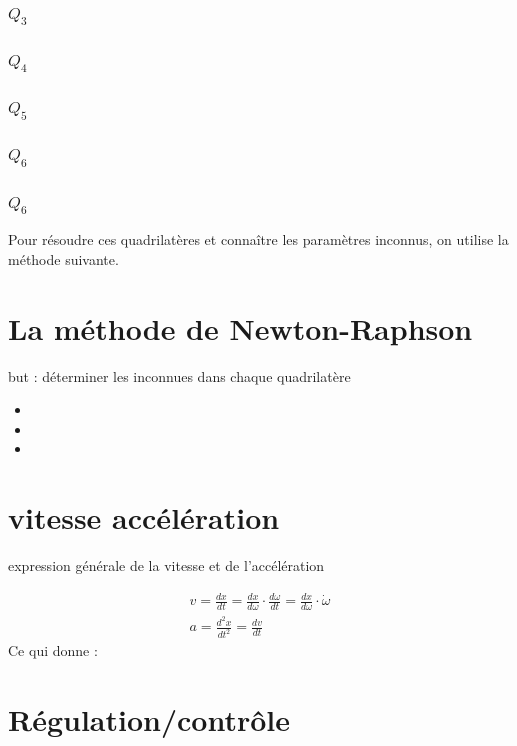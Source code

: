 \documentclass[12pt,a4paper]{article}
\begin{document}
\subsubsection{$Q_3$}

\subsubsection{$Q_4$}

\subsubsection{$Q_5$}

\subsubsection{$Q_6$}

\subsubsection{$Q_6$}

Pour résoudre ces quadrilatères et connaître les paramètres inconnus, on utilise la méthode suivante. 
\newpage
\section{La méthode de Newton-Raphson}
but : déterminer les inconnues dans chaque quadrilatère

\begin{itemize}
	\item 
	\item 
	\item 
\end{itemize}


\section{vitesse accélération}


expression générale de la vitesse et de l'accélération

\begin{eqnarray}
v=\frac{d x}{dt}=\frac{d x}{d \omega} \cdot \frac{d \omega}{dt}=\frac{d x}{d \omega} \cdot \dot{\omega}\\
a=\frac{d^2 x}{dt^2}=\frac{dv}{dt}
\end{eqnarray}
Ce qui donne : 


\section{Régulation/contrôle}
\end{document}
